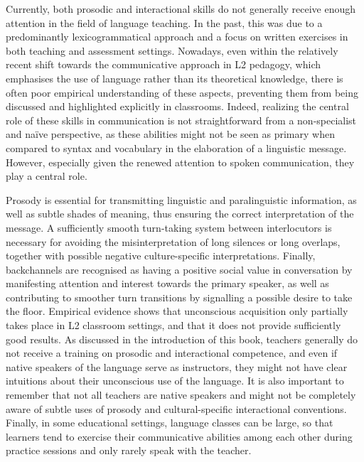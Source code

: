 \begin{stylecaption}
\textup{Currently, both prosodic and interactional skills do not generally receive enough attention in the field of language teaching. In the past, this was due to a predominantly lexicogrammatical approach and a focus on written exercises in both teaching and assessment settings. Nowadays, even within the relatively recent shift towards the communicative approach in L2 pedagogy, which emphasises the use of language rather than its theoretical knowledge, there is often poor empirical understanding of these aspects, preventing them from being discussed and highlighted explicitly in classrooms. Indeed, realizing the central role of these skills in communication is not straightforward from a non-specialist and naïve perspective, as these abilities might not be seen as primary when compared to syntax and vocabulary in the elaboration of a linguistic message. However, especially given the renewed attention to spoken communication, they play a central role. }
\end{stylecaption}

\begin{stylecaption}
\textup{Prosody is essential for transmitting linguistic and paralinguistic information, as well as subtle shades of meaning, thus ensuring the correct interpretation of the message. A sufficiently smooth turn-taking system between interlocutors is necessary for avoiding the misinterpretation of long silences or long overlaps, together with possible negative culture-specific interpretations. Finally, backchannels are recognised as having a positive social value in conversation by manifesting attention and interest towards the primary speaker, as well as contributing to smoother turn transitions by signalling a possible desire to take the floor. Empirical evidence shows that unconscious acquisition only partially takes place in L2 classroom settings, and that it does not provide sufficiently good results. As discussed in the introduction of this book, teachers generally do not receive a training on prosodic and interactional competence, and even if native speakers of the language serve as instructors, they might not have clear intuitions about their unconscious use of the language. It is also important to remember that not all teachers are native speakers and might not be completely aware of subtle uses of prosody and cultural-specific interactional conventions. Finally, in some educational settings, language classes can be large, so that learners tend to exercise their communicative abilities among each other during practice sessions and only rarely speak with the teacher. }
\end{stylecaption}

